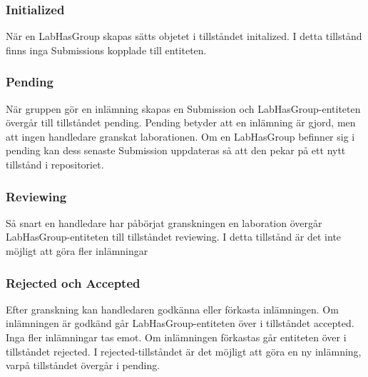 \subsubsection{Initialized}

När en LabHasGroup skapas sätts objetet i tillståndet initalized. I detta tillstånd finns inga Submissions kopplade till entiteten.

\subsubsection{Pending}

När gruppen gör en inlämning skapas en Submission och LabHasGroup-entiteten övergår till tillståndet pending. Pending betyder att en inlämning är gjord, men att ingen handledare granskat laborationen.
Om en LabHasGroup befinner sig i pending kan dess senaste Submission uppdateras så att den pekar på ett nytt tillstånd i repositoriet.

\subsubsection{Reviewing}

Så snart en handledare har påbörjat granskningen en laboration övergår LabHasGroup-entiteten till tillståndet reviewing. I detta tillstånd är det inte möjligt att göra fler inlämningar

\subsubsection{Rejected och Accepted}

Efter granskning kan handledaren godkänna eller förkasta inlämningen. Om inlämningen är godkänd går LabHasGroup-entiteten över i tillståndet accepted. Inga fler inlämningar tas emot. Om inlämningen förkastas går entiteten över i tillståndet rejected. I rejected-tillståndet är det möjligt att göra en ny inlämning, varpå tillståndet övergår i pending.
